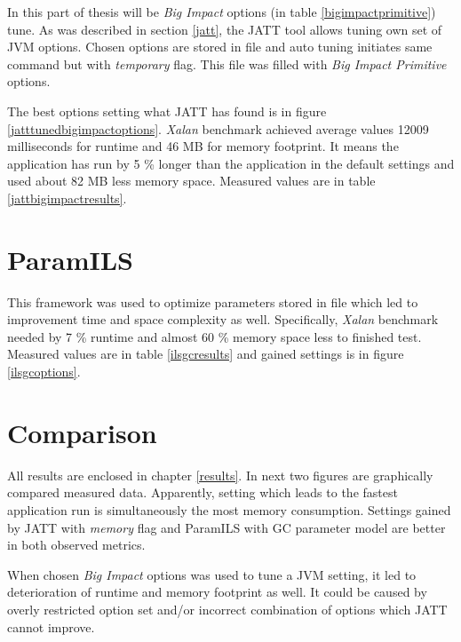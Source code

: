 \documentclass[
  digital, %
  oneside,
  notable, %
  nolof,     %
  nolot     %
]{fithesis3}
\begin{document}
In this part of thesis will be \textit{Big Impact} options (in table \ref{bigimpactprimitive}) tune. As was described in section \ref{jatt}, the JATT tool allows tuning own set of JVM options. Chosen options are stored in \texttt{} file and auto tuning initiates same command but with \textit{temporary} flag. This file was filled with \textit{Big Impact Primitive} options.

The best options setting what JATT has found is in figure \ref{jatttunedbigimpactoptions}. \textit{Xalan} benchmark achieved average values 12009 milliseconds for runtime and 46 MB for memory footprint. It means the application has run by 5 \% longer than the application in the default settings and used about 82 MB less memory space. Measured values are in table \ref{jattbigimpactresults}.

\section{ParamILS}
This framework was used to optimize parameters stored in \texttt{} file which led to improvement time and space complexity as well. Specifically, \textit{Xalan} benchmark needed by 7 \% runtime and almost 60 \% memory space less to finished test. Measured values are in table \ref{ilsgcresults} and gained settings is in figure \ref{ilsgcoptions}.

\section{Comparison}
All results are enclosed in chapter \ref{results}. In next two figures are graphically compared measured data. Apparently, setting which leads to the fastest application run is simultaneously the most memory consumption. Settings gained by JATT with \textit{memory} flag and ParamILS with GC parameter model are better in both observed metrics.

When chosen \textit{Big Impact} options was used to tune a JVM setting, it led to deterioration of runtime and memory footprint as well. It could be caused by overly restricted option set and/or incorrect combination of options which JATT cannot improve.
\end{document}
